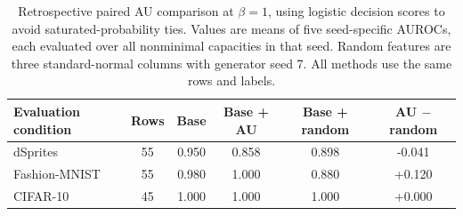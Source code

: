 \begin{table}[H]
\caption{Retrospective paired AU comparison at $\beta=1$, using logistic decision scores to avoid saturated-probability ties. Values are means of five seed-specific AUROCs, each evaluated over all nonminimal capacities in that seed. Random features are three standard-normal columns with generator seed 7. All methods use the same rows and labels.}\label{tab:au}
\footnotesize
\setlength{\tabcolsep}{3.5pt}
\begin{tabular*}{\textwidth}{@{\extracolsep{\fill}}lccccc@{}}
\toprule
Evaluation condition & Rows & Base & Base + AU & Base + random & AU $-$ random \\
\midrule
dSprites & 55 & 0.950 & 0.858 & 0.898 & -0.041 \\
Fashion-MNIST & 55 & 0.980 & 1.000 & 0.880 & +0.120 \\
CIFAR-10 & 45 & 1.000 & 1.000 & 1.000 & +0.000 \\
\bottomrule
\end{tabular*}
\end{table}
